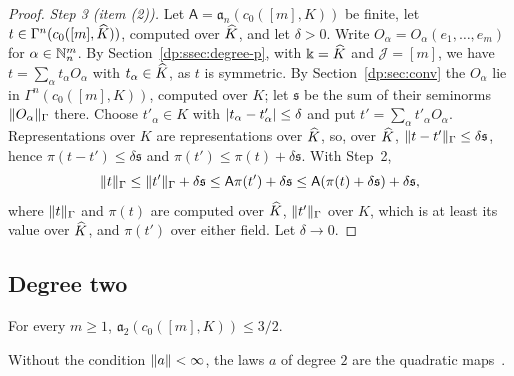 \begin{proof}
\emph{Step 3 (item (2)).} Let $\mathsf A=\mathfrak a_n(c_0([m],K))$ be finite, let $t\in\Gamma^n(c_0([m],\widehat K))$, computed over $\widehat K$, and let $\delta>0$. Write $O_\alpha=O_\alpha(e_1,\dots,e_m)$ for $\alpha\in\mathbb N^m_n$. By Section~\ref{dp:ssec:degree-p}, with $\Bbbk=\widehat K$ and $\mathcal J=[m]$, we have $t=\sum_\alpha t_\alpha O_\alpha$ with $t_\alpha\in\widehat K$, as $t$ is symmetric. By Section~\ref{dp:sec:conv} the $O_\alpha$ lie in $\Gamma^n(c_0([m],K))$, computed over $K$; let $\mathfrak s$ be the sum of their seminorms $\lVert O_\alpha\rVert_\Gamma$ there. Choose $t'_\alpha\in K$ with $\lvert t_\alpha-t'_\alpha\rvert\le\delta$ and put $t'=\sum_\alpha t'_\alpha O_\alpha$. Representations over $K$ are representations over $\widehat K$, so, over $\widehat K$, $\lVert t-t'\rVert_\Gamma\le\delta\mathfrak s$, hence $\pi(t-t')\le\delta\mathfrak s$ and $\pi(t')\le\pi(t)+\delta\mathfrak s$. With Step~2,
\[
 \lVert t\rVert_\Gamma\le\lVert t'\rVert_\Gamma+\delta\mathfrak s\le\mathsf A\pi(t')+\delta\mathfrak s\le\mathsf A(\pi(t)+\delta\mathfrak s)+\delta\mathfrak s,
\]
where $\lVert t\rVert_\Gamma$ and $\pi(t)$ are computed over $\widehat K$, $\lVert t'\rVert_\Gamma$ over $K$, which is at least its value over $\widehat K$, and $\pi(t')$ over either field. Let $\delta\to0$.
\end{proof}

\subsection{Degree two}\label{dp:ac:degree-two}

\begin{lemma}\label{dp:lem:degree-two}
For every $m\ge1$, $\mathfrak a_2(c_0([m],K))\le3/2$.
\end{lemma}

Without the condition $\lVert a\rVert<\infty$, the laws $a$ of degree $2$ are the quadratic maps~\cite[Prop.~II.1]{Ro}.

